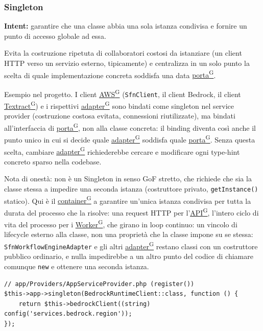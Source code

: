\documentclass[a4paper,12pt]{article}
\providecommand{\glslink}[2]{\href{https://alittlebyte-19.github.io/Documentazione/glossario.html\#gls-#1}{\underline{#2}\textsuperscript{\scriptsize G}}}
\begin{document}
\begin{sloppypar}
\subsubsection{Singleton}

\textbf{Intent:} garantire che una classe abbia una sola istanza condivisa e fornire un punto di accesso globale ad essa.

Evita la costruzione ripetuta di collaboratori costosi da istanziare (un client HTTP verso un servizio esterno, tipicamente) e centralizza in un solo punto la scelta di quale implementazione concreta soddisfa una data \glslink{porta}{porta}.

Esempio nel progetto. I client \glslink{aws}{AWS} (\texttt{SfnClient}, il client Bedrock, il client \glslink{textract}{Textract}) e i rispettivi \glslink{adapter}{adapter} sono bindati come singleton nel service provider (costruzione costosa evitata, connessioni riutilizzate), ma bindati all'interfaccia di \glslink{porta}{porta}, non alla classe concreta: il binding diventa così anche il punto unico in cui si decide quale \glslink{adapter}{adapter} soddisfa quale \glslink{porta}{porta}. Senza questa scelta, cambiare \glslink{adapter}{adapter} richiederebbe cercare e modificare ogni type-hint concreto sparso nella codebase.

Nota di onestà: non è un Singleton in senso GoF stretto, che richiede che sia la classe stessa a impedire una seconda istanza (costruttore privato, \texttt{getInstance()} statico). Qui è il \glslink{container}{container} a garantire un'unica istanza condivisa per tutta la durata del processo che la risolve: una request HTTP per l'\glslink{api-application-programming-interface}{API}, l'intero ciclo di vita del processo per i \glslink{worker}{Worker}, che girano in loop continuo: un vincolo di lifecycle esterno alla classe, non una proprietà che la classe impone su se stessa: \texttt{SfnWorkflowEngineAdapter} e gli altri \glslink{adapter}{adapter} restano classi con un costruttore pubblico ordinario, e nulla impedirebbe a un altro punto del codice di chiamare comunque \texttt{new} e ottenere una seconda istanza.

\begin{lstlisting}[style=phplisting, caption={AppServiceProvider: binding singleton dei client AWS e delle porte secondarie}]
// app/Providers/AppServiceProvider.php (register())
$this->app->singleton(BedrockRuntimeClient::class, function () {
    return $this->bedrockClient((string) config('services.bedrock.region'));
});


\end{lstlisting}
\end{sloppypar}
\end{document}
